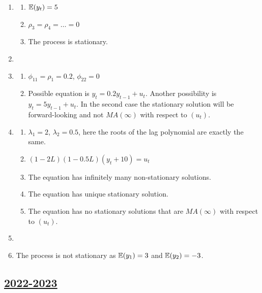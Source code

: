 \begin{enumerate}
    \item 
    \begin{enumerate}
        \item $\operatorname{\mathbb{E}}(y_t) = 5$
        \item $\rho_3 = \rho_4 = \ldots = 0$
        \item The process is stationary.
    \end{enumerate}
    \item 
    \item 
    \begin{enumerate}
        \item $\phi_{11} = \rho_1 = 0.2$, $\phi_{22} = 0$
        \item Possible equation is $y_t = 0.2 y_{t-1} + u_t$. 
        Another possibility is $y_t = 5 y_{t-1} + u_t$. 
        In the second case the stationary solution will be forward-looking and not $MA(\infty)$ with respect to $(u_t)$.
    \end{enumerate}
    \item 
    \begin{enumerate}
        \item $\lambda_1 = 2$, $\lambda_2 = 0.5$, here the roots of the lag polynomial are exactly the same. 
        \item $(1 - 2L)(1 - 0.5L) (y_t + 10) = u_t$
        \item The equation has infinitely many non-stationary solutions.
        \item The equation has unique stationary solution.
        \item The equation has no stationary solutions that are $MA(\infty)$ with respect to $(u_t)$.
    \end{enumerate}
    \item 
    \item The process is not stationary as $\operatorname{\mathbb{E}}(y_1) = 3$ and $\operatorname{\mathbb{E}}(y_2) = -3$.

\end{enumerate}


\subsection[2022-2023]{\hyperref[sec:kr_03_2022_2023]{2022-2023}}
\label{sec:sol_kr_03_2022_2023} %

